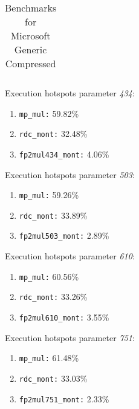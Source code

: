 \begin{table}[H]
\begin{tabular}{|K{2.5cm}|K{2.5cm}|K{2.5cm}|K{2.5cm}|K{2.5cm}|}
	\hline
	\end{tabular}
	\caption[Benchmarks for Microsoft Generic Compressed]{Benchmarks for Microsoft Generic Compressed}
	\label{tab:benchmarks_Microsoft_Generic_Compressed}
\end{table}
Execution hotspots parameter \textit{434}:
\begin{enumerate}[noitemsep]
	\item \texttt{mp\_mul:} 59.82\%
	\item \texttt{rdc\_mont:} 32.48\%
	\item \texttt{fp2mul434\_mont:} 4.06\%
\end{enumerate}
Execution hotspots parameter \textit{503}:
\begin{enumerate}[noitemsep]
	\item \texttt{mp\_mul:} 59.26\%
	\item \texttt{rdc\_mont:} 33.89\%
	\item \texttt{fp2mul503\_mont:} 2.89\%
\end{enumerate}
Execution hotspots parameter \textit{610}:
\begin{enumerate}[noitemsep]
	\item \texttt{mp\_mul:} 60.56\%
	\item \texttt{rdc\_mont:} 33.26\%
	\item \texttt{fp2mul610\_mont:} 3.55\%
\end{enumerate}
Execution hotspots parameter \textit{751}:
\begin{enumerate}[noitemsep]
	\item \texttt{mp\_mul:} 61.48\%
	\item \texttt{rdc\_mont:} 33.03\%
	\item \texttt{fp2mul751\_mont:} 2.33\%
\end{enumerate}
